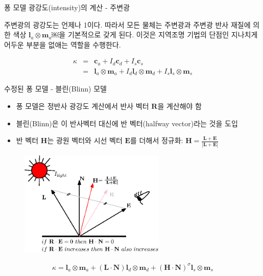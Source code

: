 \documentclass{beamer}
\begin{document}
\begin{frame}[fragile]{퐁 모델 광강도(intensity)의 계산 - 주변광}

주변광의 광강도는 언제나 1이다. 따라서 모든 물체는 주변광과 주변광 반사 재질에 의한 색상
$\mathbf l_a \otimes \mathbf m_a$￼을 기본적으로 갖게 된다.  이것은 지역조명 기법의 단점인 지나치게 어두운 부분을 없애는 역할을 수행한다.

\begin{eqnarray} \nonumber
\kappa & = & \mathbf c_a + I_d \mathbf c_d + I_s \mathbf c_s \\ \nonumber 
&  =  & \mathbf l_a \otimes \mathbf m_a + I_d \mathbf l_d \otimes \mathbf m_d + I_s \mathbf l_s \otimes \mathbf m_s \nonumber
\end{eqnarray}

\end{frame}

\begin{frame}[fragile]{수정된 퐁 모델 - 블린(Blinn) 모델}

\begin{itemize}
\item 퐁 모델은 정반사 광강도 계산에서 반사 벡터 $\mathbf R$을 계산해야 함
\item 블린(Blinn)은 이 반사벡터 대신에 반 벡터(halfway vector)라는 것을 도입
\item 반 벡터 $\mathbf H$는 광원 벡터와 시선 벡터 $\mathbf E$를 더해서 정규화: $\mathbf H = \frac{\mathbf L + \mathbf E}{|\mathbf L + \mathbf E|}$
\end{itemize}

\begin{figure}[h!]
  \centering
    \includegraphics[height=5cm]{OGL_light/halfwayVector.eps}
\end{figure}

\begin{eqnarray}
\kappa  =  \mathbf l_a \otimes \mathbf m_a + (\mathbf L \cdot \mathbf N) \mathbf l_d \otimes \mathbf m_d + 
(\mathbf H \cdot \mathbf N )^\sigma \mathbf l_s \otimes \mathbf m_s \nonumber
\end{eqnarray}


\end{frame}
\end{document}
